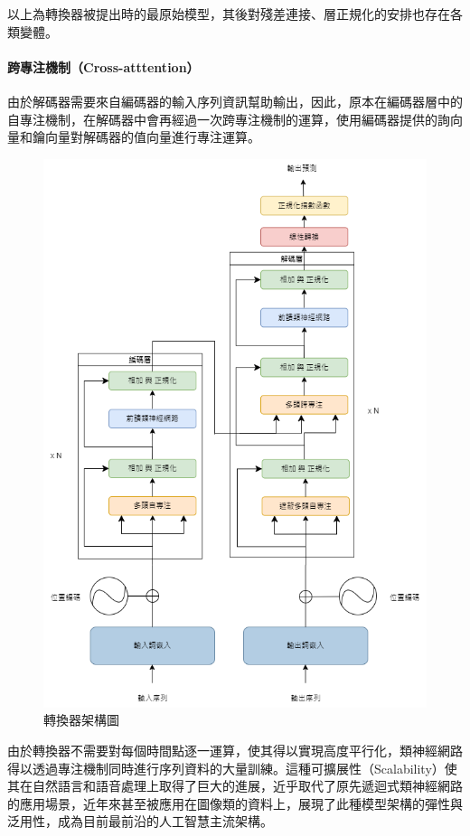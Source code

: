 以上為轉換器被提出時的最原始模型，其後對殘差連接、層正規化的安排也存在各類變體。

\paragraph{跨專注機制（Cross-atttention）}

由於解碼器需要來自編碼器的輸入序列資訊幫助輸出，因此，原本在編碼器層中的自專注機制，在解碼器中會再經過一次跨專注機制的運算，使用編碼器提供的詢向量和鑰向量對解碼器的值向量進行專注運算。


\begin{figure}
    \centering
    \includegraphics[width=0.9\linewidth]{figures/tfm_arch.drawio.png}
    \caption{轉換器架構圖}
    \label{fig:tfm_arch}
\end{figure}

由於轉換器不需要對每個時間點逐一運算，使其得以實現高度平行化，類神經網路得以透過專注機制同時進行序列資料的大量訓練。這種可擴展性（Scalability）使其在自然語言和語音處理上取得了巨大的進展，近乎取代了原先遞迴式類神經網路的應用場景，近年來甚至被應用在圖像類的資料上\cite{dosovitskiy2021image}，展現了此種模型架構的彈性與泛用性，成為目前最前沿的人工智慧主流架構。

